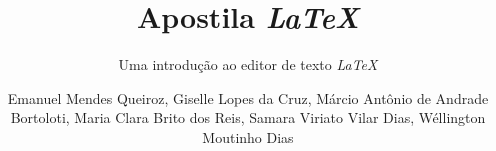 \documentclass[graybox,envcountchap,sectrefs]{svmono}
\begin{document}
\author{Emanuel Mendes Queiroz, Giselle Lopes da Cruz, M\'arcio Ant\^onio de Andrade Bortoloti, Maria Clara Brito dos Reis, Samara Viriato Vilar Dias, Wéllington Moutinho Dias}
\title{Apostila \textit{LaTeX}}
\subtitle{Uma introdu\c c\~ao ao editor de texto \textit{LaTeX}}
\maketitle

\frontmatter%



\tableofcontents

\mainmatter%







\backmatter%
% 
% 

\end{document}
